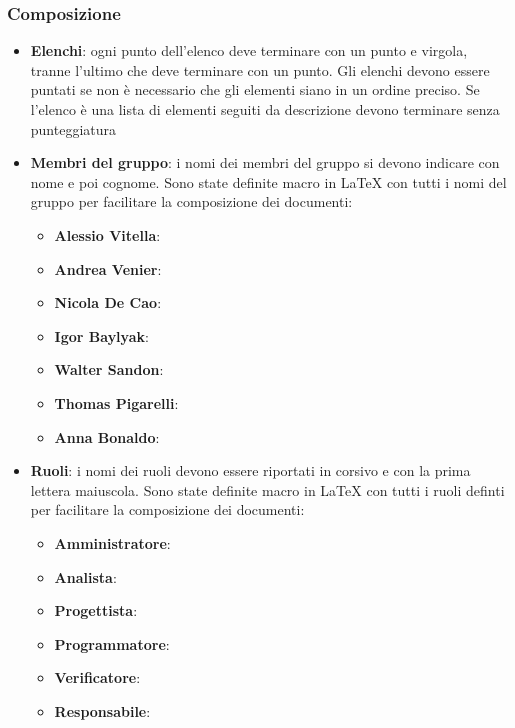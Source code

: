 \documentclass[12pt,a4paper]{article}
\begin{document}
\subsubsection{Composizione}
\begin{itemize}
	\item \textbf{Elenchi}: ogni punto dell'elenco deve terminare con un punto e virgola, tranne l'ultimo che deve terminare con un punto. Gli elenchi devono essere puntati se non è necessario che gli elementi siano in un ordine preciso. Se l'elenco è una lista di elementi seguiti da descrizione devono terminare senza punteggiatura
	\item \textbf{Membri del gruppo}: i nomi dei membri del gruppo si devono indicare con nome e poi cognome. Sono state definite macro in \LaTeX{} con tutti i nomi del gruppo per facilitare la composizione dei documenti:
	\begin{itemize}
		\item \textbf{Alessio Vitella}: 
		\item \textbf{Andrea Venier}: 
		\item \textbf{Nicola De Cao}: 
		\item \textbf{Igor Baylyak}: 
		\item \textbf{Walter Sandon}: 
		\item \textbf{Thomas Pigarelli}: 
		\item \textbf{Anna Bonaldo}: 
	\end{itemize}
	\item \textbf{Ruoli}: i nomi dei ruoli devono essere riportati in corsivo e con la prima lettera maiuscola. Sono state definite macro in \LaTeX{} con tutti i ruoli definti per facilitare la composizione dei documenti:
	\begin{itemize}
		\item \textbf{Amministratore}: 
		\item \textbf{Analista}: 
		\item \textbf{Progettista}: 
		\item \textbf{Programmatore}: 
		\item \textbf{Verificatore}: 
		\item \textbf{Responsabile}: 
	\end{itemize}

\end{itemize}
\end{document}
